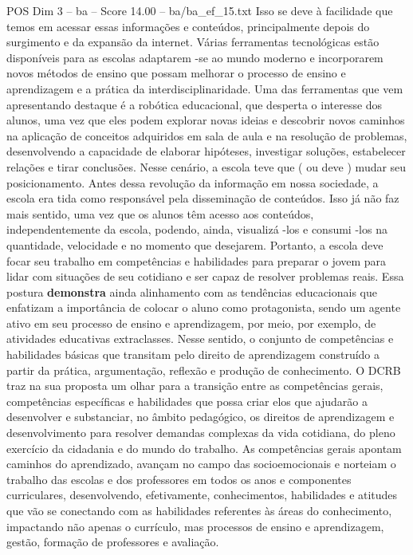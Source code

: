 \begin{textsample}{POS Dim 3 – ba – Score 14.00 – ba/ba\_ef\_15.txt}
Isso se deve à facilidade que temos em acessar essas informações e conteúdos, principalmente depois do surgimento e da expansão da internet.
Várias ferramentas tecnológicas estão disponíveis para as escolas adaptarem -se ao mundo moderno e incorporarem novos métodos de ensino que possam melhorar o processo de ensino e aprendizagem e a prática da interdisciplinaridade.
Uma das ferramentas que vem apresentando destaque é a robótica educacional, que desperta o interesse dos alunos, uma vez que eles podem explorar novas ideias e descobrir novos caminhos na aplicação de conceitos adquiridos em sala de aula e na resolução de problemas, desenvolvendo a capacidade de elaborar hipóteses, investigar soluções, estabelecer relações e tirar conclusões.
Nesse cenário, a escola teve que ( ou deve ) mudar seu posicionamento.
Antes dessa revolução da informação em nossa sociedade, a escola era tida como responsável pela disseminação de conteúdos.
Isso já não faz mais sentido, uma vez que os alunos têm acesso aos conteúdos, independentemente da escola, podendo, ainda, visualizá -los e consumi -los na quantidade, velocidade e no momento que desejarem.
Portanto, a escola deve focar seu trabalho em competências e habilidades para preparar o jovem para lidar com situações de seu cotidiano e ser capaz de resolver problemas reais.
Essa postura \textbf{demonstra} ainda alinhamento com as tendências educacionais que enfatizam a importância de colocar o aluno como protagonista, sendo um agente ativo em seu processo de ensino e aprendizagem, por meio, por exemplo, de atividades educativas extraclasses.
Nesse sentido, o conjunto de competências e habilidades básicas que transitam pelo direito de aprendizagem construído a partir da prática, argumentação, reflexão e produção de conhecimento.
O DCRB traz na sua proposta um olhar para a transição entre as competências gerais, competências específicas e habilidades que possa criar elos que ajudarão a desenvolver e substanciar, no âmbito pedagógico, os direitos de aprendizagem e desenvolvimento para resolver demandas complexas da vida cotidiana, do pleno exercício da cidadania e do mundo do trabalho.
As competências gerais apontam caminhos do aprendizado, avançam no campo das socioemocionais e norteiam o trabalho das escolas e dos professores em todos os anos e componentes curriculares, desenvolvendo, efetivamente, conhecimentos, habilidades e atitudes que vão se conectando com as habilidades referentes às áreas do conhecimento, impactando não apenas o currículo, mas processos de ensino e aprendizagem, gestão, formação de professores e avaliação.

\end{textsample}
